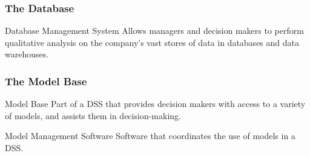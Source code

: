 \documentclass[\main/notes.tex]{subfiles}
\begin{document}
				\subsubsection{The Database}
					\begin{definition}{Database Management System}
						Allows managers and decision makers to perform qualitative analysis on the company's vast stores of data in databases and data warehouses.
					\end{definition}
				\subsubsection{The Model Base}
					\begin{definition}{Model Base}
						Part of a DSS that provides decision makers with access to a variety of models, and assists them in decision-making.
					\end{definition}
					\begin{definition}{Model Management Software}
						Software that coordinates the use of models in a DSS.
					\end{definition}
\end{document}
